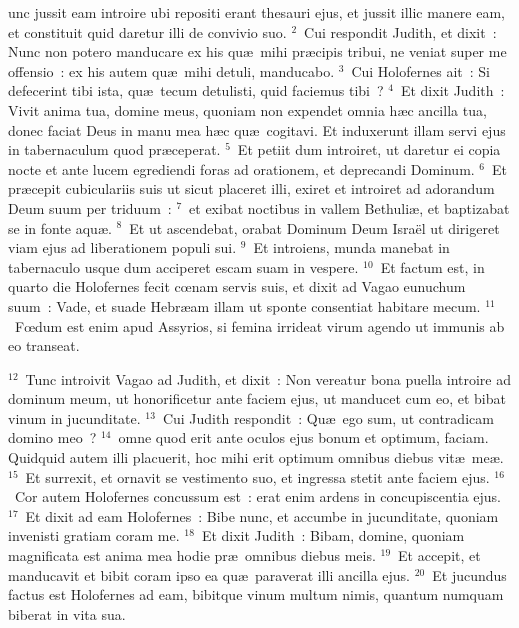 \bchapter
{}unc jussit eam introire ubi repositi erant thesauri ejus, et jussit illic manere eam, et constituit quid daretur illi de convivio suo.
${}^{2}$~Cui respondit Judith, et dixit~: Nunc non potero manducare ex his qu\ae\ mihi pr\ae cipis tribui, ne veniat super me offensio~: ex his autem qu\ae\ mihi detuli, manducabo.
${}^{3}$~Cui Holofernes ait~: Si defecerint tibi ista, qu\ae\ tecum detulisti, quid faciemus tibi~?
${}^{4}$~Et dixit Judith~: Vivit anima tua, domine meus, quoniam non expendet omnia h\ae c ancilla tua, donec faciat Deus in manu mea h\ae c qu\ae\ cogitavi. Et induxerunt illam servi ejus in tabernaculum quod pr\ae ceperat.
${}^{5}$~Et petiit dum introiret, ut daretur ei copia nocte et ante lucem egrediendi foras ad orationem, et deprecandi Dominum.
${}^{6}$~Et pr\ae cepit cubiculariis suis ut sicut placeret illi, exiret et introiret ad adorandum Deum suum per triduum~:
${}^{7}$~et exibat noctibus in vallem Bethuli\ae , et baptizabat se in fonte aqu\ae .
${}^{8}$~Et ut ascendebat, orabat Dominum Deum Isra\"el ut dirigeret viam ejus ad liberationem populi sui.
${}^{9}$~Et introiens, munda manebat in tabernaculo usque dum acciperet escam suam in vespere.
${}^{10}$~Et factum est, in quarto die Holofernes fecit cœnam servis suis, et dixit ad Vagao eunuchum suum~: Vade, et suade Hebr\ae am illam ut sponte consentiat habitare mecum.
${}^{11}$~Fœdum est enim apud Assyrios, si femina irrideat virum agendo ut immunis ab eo transeat.


${}^{12}$~Tunc introivit Vagao ad Judith, et dixit~: Non vereatur bona puella introire ad dominum meum, ut honorificetur ante faciem ejus, ut manducet cum eo, et bibat vinum in jucunditate.
${}^{13}$~Cui Judith respondit~: Qu\ae\ ego sum, ut contradicam domino meo~?
${}^{14}$~omne quod erit ante oculos ejus bonum et optimum, faciam. Quidquid autem illi placuerit, hoc mihi erit optimum omnibus diebus vit\ae\ me\ae .
${}^{15}$~Et surrexit, et ornavit se vestimento suo, et ingressa stetit ante faciem ejus.
${}^{16}$~Cor autem Holofernes concussum est~: erat enim ardens in concupiscentia ejus.
${}^{17}$~Et dixit ad eam Holofernes~: Bibe nunc, et accumbe in jucunditate, quoniam invenisti gratiam coram me.
${}^{18}$~Et dixit Judith~: Bibam, domine, quoniam magnificata est anima mea hodie pr\ae\ omnibus diebus meis.
${}^{19}$~Et accepit, et manducavit et bibit coram ipso ea qu\ae\ paraverat illi ancilla ejus.
${}^{20}$~Et jucundus factus est Holofernes ad eam, bibitque vinum multum nimis, quantum numquam biberat in vita sua.

